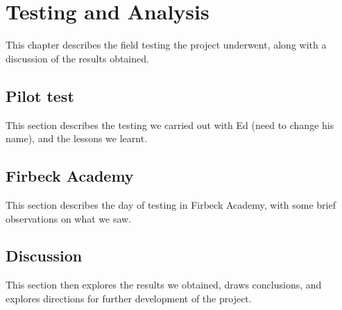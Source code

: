 \chapter{Testing and Analysis}

This chapter describes the field testing the project underwent,
along with a discussion of the results obtained.

\section{Pilot test}
This section describes the testing we carried out with Ed (need to
change his name), and the lessons we learnt.

\section{Firbeck Academy}
This section describes the day of testing in Firbeck Academy, with
some brief observations on what we saw.

\section{Discussion}
This section then explores the results we obtained, draws conclusions,
and explores directions for further development of the project.
